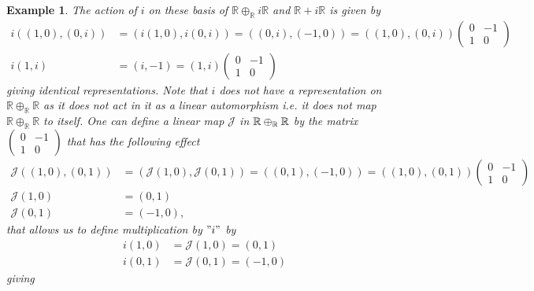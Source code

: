 \documentclass[aps,preprint]{revtex4}
\newtheorem{example}[theorem]{Example}
\begin{document}
\begin{example}
The action of $i$ on these basis of $\mathbb{R\oplus _{\mathbb{R}}}i\mathbb{R%
}$ and $\mathbb{R}+i\mathbb{R}$ is given by 
\begin{align}
i\left( \left( 1,0\right) ,\left( 0,i\right) \right) & =\left( i\left(
1,0\right) ,i\left( 0,i\right) \right) =\left( \left( 0,i\right) ,\left(
-1,0\right) \right) =\left( \left( 1,0\right) ,\left( 0,i\right) \right)
\left( 
\begin{array}{cc}
0 & -1 \\ 
1 & 0%
\end{array}%
\right) \\
i\left( 1,i\right) & =\left( i,-1\right) =\left( 1,i\right) \left( 
\begin{array}{cc}
0 & -1 \\ 
1 & 0%
\end{array}%
\right)
\end{align}%
giving identical representations. \emph{Note that} $i$ \emph{does not} have
a representation on $\mathbb{R\oplus _{\mathbb{R}}R}$ as it does not act in
it as a linear automorphism i.e. it does not map $\mathbb{R\oplus _{\mathbb{R%
}}R}$ to itself. One can define a linear map $\mathcal{J}$ in $\mathbb{%
R\oplus _{\mathbb{R}}R}$ by the matrix $\left( 
\begin{array}{cc}
0 & -1 \\ 
1 & 0%
\end{array}%
\right) $ that has the following effect 
\begin{align}
\mathcal{J}\left( \left( 1,0\right) ,\left( 0,1\right) \right) & =\left( 
\mathcal{J}\left( 1,0\right) ,\mathcal{J}\left( 0,1\right) \right) =\left(
\left( 0,1\right) ,\left( -1,0\right) \right) =\left( \left( 1,0\right)
,\left( 0,1\right) \right) \left( 
\begin{array}{cc}
0 & -1 \\ 
1 & 0%
\end{array}%
\right) \\
\mathcal{J}\left( 1,0\right) & =\left( 0,1\right) \\
\mathcal{J}\left( 0,1\right) & =\left( -1,0\right) ,
\end{align}%
that allows us to define multiplication by $"i"$ by%
\begin{align}
i\left( 1,0\right) & =\mathcal{J}\left( 1,0\right) =\left( 0,1\right) \\
i\left( 0,1\right) & =\mathcal{J}\left( 0,1\right) =\left( -1,0\right)
\end{align}%
giving%
\begin{align}

\end{align}
\end{example}
\end{document}
